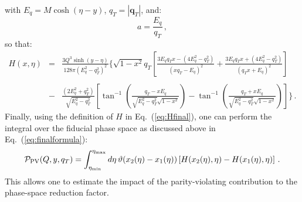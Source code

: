 \documentclass[10pt,a4paper]{article}
\begin{document}
with $E_q=M\cosh\left(\eta - y\right)$, $q_T=|\mathbf{q}_T|$, and:
\begin{equation}
  a = \frac{E_q}{q_T}\,,
\end{equation}
so that:
\begin{equation}\label{eq:Hfinal}
\begin{array}{rcl}
\displaystyle H(x,\eta)&=&\displaystyle\frac{3Q^3 \sinh(y-\eta)}{128\pi (E_q^2-q_T^2)^{2}}\Bigg\{\sqrt{1-x^2}q_T\left[\frac{3E_qq_Tx-(4E_q^2-q_T^2) }{(xq_T-
  E_q)^2}+\frac{3E_qq_Tx+(4E_q^2-q_T^2) }{(q_Tx+
  E_q)^2}\right]\\
\\
&-&\displaystyle\frac{(2E_q^2+q_T^2)}{\sqrt{E_q^2-q_T^2}}\left[\tan^{-1}\left(\frac{q_T-
      xE_q}{\sqrt{E_q^2-q_T^2}\sqrt{1-x^2}}\right) -\tan^{-1}\left(\frac{q_T+
      xE_q}{\sqrt{E_q^2-q_T^2}\sqrt{1-x^2}}\right)\right]\Bigg\}\,.
\end{array}
\end{equation}
Finally, using the definition of $H$ in Eq.~(\ref{eq:Hfinal}), one can
perform the integral over the fiducial phase space as discussed
above in Eq.~(\ref{eq:finalformula}):
\begin{equation}\label{eq:finalformulaH}
  \mathcal{P}_{\rm PV}(Q,y,q_T)=\displaystyle \int_{\eta_{\rm
      min}}^{\eta_{\rm
      max}}d\eta\,\vartheta(x_2(\eta)-x_1(\eta))\left[H(x_2(\eta),\eta)-H(x_1(\eta) ,\eta)\right]\,.
\end{equation}
This allows one to estimate the impact of the parity-violating
contribution to the phase-space reduction factor.
\end{document}
